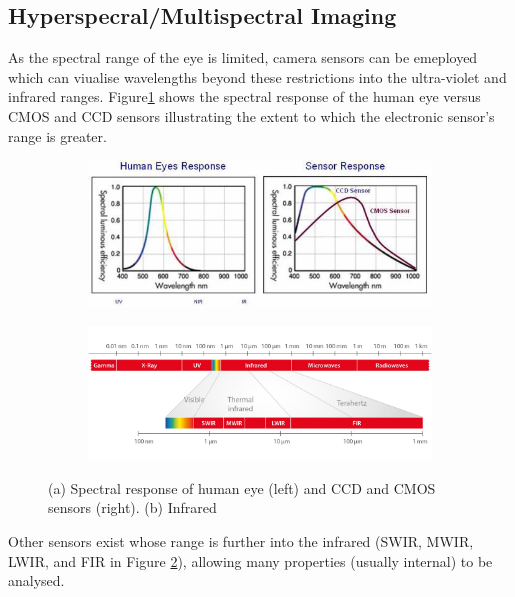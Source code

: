 \documentclass[fleqn,twoside]{article}
\begin{document}
\subsection{Hyperspecral/Multispectral Imaging}
\label{sec:lit_hyperspec}

As the spectral range of the eye is limited, camera sensors can be emeployed which can viualise wavelengths beyond these restrictions into the ultra-violet and infrared ranges. Figure\ref{fig:eye_sensor} shows the spectral response of the human eye versus CMOS and CCD sensors illustrating the extent to which the electronic sensor's range is greater.

\begin{figure}[h]
	\centering
	\begin{subfigure}{.9\textwidth}
		\centering
		\includegraphics[width=0.9\linewidth]{spectralresponse.jpg}
		\caption{}
		\label{fig:eye_sensor}
	\end{subfigure}

	\begin{subfigure}{.9\textwidth}
		\centering
		\includegraphics[width=.9\linewidth]{infra-red.jpg}
		\caption{}
		\label{fig:ifra-red}
	\end{subfigure}%
	\caption{(a) Spectral response of human eye (left) and CCD and CMOS sensors (right). (b) Infrared}
	\label{fig:spectrum}
\end{figure}%

Other sensors exist whose range is further into the infrared (SWIR, MWIR, LWIR, and FIR in Figure \ref{fig:ifra-red}), allowing many properties (usually internal) to be analysed.
\end{document}
